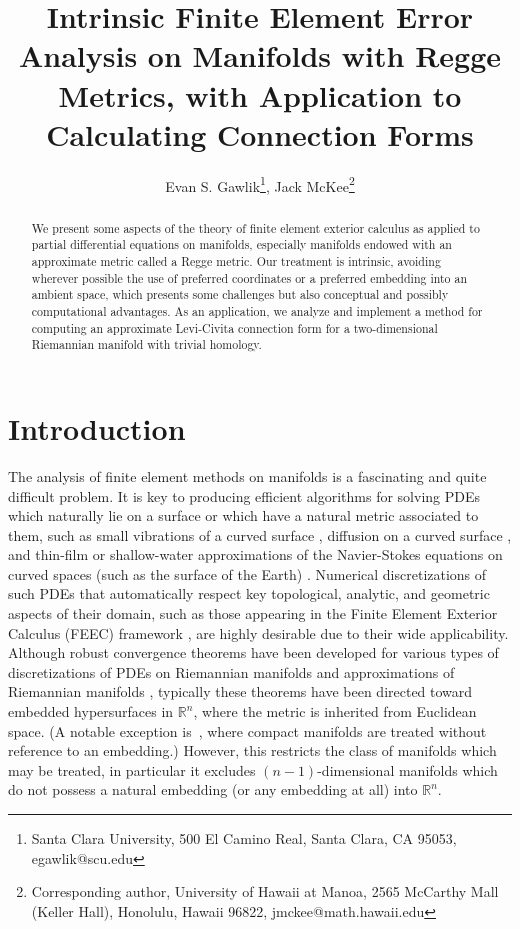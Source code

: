 \documentclass[11pt]{article}
\title{\textbf{Intrinsic Finite Element Error Analysis on Manifolds with Regge Metrics, with Application to Calculating Connection Forms}}
\author{Evan S. Gawlik\footnote{Santa Clara University,
500 El Camino Real,
Santa Clara, CA 95053, egawlik@scu.edu}, Jack McKee\footnote{Corresponding author, University of Hawaii at Manoa,
2565 McCarthy Mall (Keller Hall),
Honolulu, Hawaii 96822, jmckee@math.hawaii.edu}}
\begin{document}
\maketitle 

\begin{abstract}
    We present some aspects of the theory of finite element exterior calculus as applied to partial differential equations on manifolds, especially manifolds endowed with an approximate metric called a Regge metric. Our treatment is intrinsic, avoiding wherever possible the use of preferred coordinates or a preferred embedding into an ambient space, which presents some challenges but also conceptual and possibly computational advantages. As an application, we analyze and implement a method for computing an approximate Levi-Civita connection form for a two-dimensional Riemannian manifold with trivial homology.
\end{abstract}



\section{Introduction}

The analysis of finite element methods on manifolds is a fascinating and quite difficult problem. It is key to producing efficient algorithms for solving PDEs which naturally lie on a surface or which have a natural metric associated to them, such as small vibrations of a curved surface \cite{Glinskii}, diffusion on a curved surface \cite{Faraudo}, and thin-film or shallow-water approximations of the Navier-Stokes equations on curved spaces (such as the surface of the Earth) \cite{Samavaki}.
Numerical discretizations of such PDEs that automatically respect key topological, analytic, and geometric aspects of their domain, such as those appearing in the Finite Element Exterior Calculus (FEEC) framework \cite{Arnold,Arnold-Winther}, are highly desirable due to their wide applicability. 
Although robust convergence theorems have been developed for various types of discretizations of PDEs on Riemannian manifolds and approximations of Riemannian manifolds \cite{Dziuk_Elliott_2013,Holst-Stern,demlow2009higher}, typically these theorems have been directed toward embedded hypersurfaces in $\mathbb{R}^n$, where the metric is inherited from Euclidean space. (A notable exception is~\cite{christiansen2007stability}, where compact manifolds are treated without reference to an embedding.)  However, this restricts the class of manifolds which may be treated, in particular it excludes $(n-1)$-dimensional manifolds which do not possess a natural embedding (or any embedding at all) into $\mathbb{R}^n$.
\end{document}
